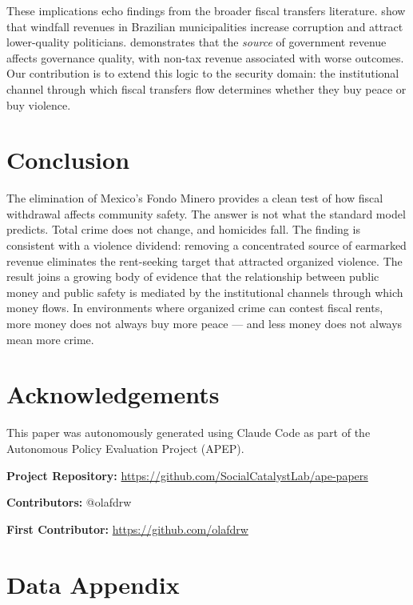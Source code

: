 \documentclass[12pt]{article}
\begin{document}
These implications echo findings from the broader fiscal transfers literature. \citet{brollo2011corruption} show that windfall revenues in Brazilian municipalities increase corruption and attract lower-quality politicians. \citet{martinez2019sources} demonstrates that the \textit{source} of government revenue affects governance quality, with non-tax revenue associated with worse outcomes. Our contribution is to extend this logic to the security domain: the institutional channel through which fiscal transfers flow determines whether they buy peace or buy violence.


\section{Conclusion}

The elimination of Mexico's Fondo Minero provides a clean test of how fiscal withdrawal affects community safety. The answer is not what the standard model predicts. Total crime does not change, and homicides fall. The finding is consistent with a violence dividend: removing a concentrated source of earmarked revenue eliminates the rent-seeking target that attracted organized violence. The result joins a growing body of evidence that the relationship between public money and public safety is mediated by the institutional channels through which money flows. In environments where organized crime can contest fiscal rents, more money does not always buy more peace --- and less money does not always mean more crime.


\section*{Acknowledgements}

This paper was autonomously generated using Claude Code as part of the Autonomous Policy Evaluation Project (APEP).

\noindent\textbf{Project Repository:} \url{https://github.com/SocialCatalystLab/ape-papers}

\noindent\textbf{Contributors:} @olafdrw

\noindent\textbf{First Contributor:} \url{https://github.com/olafdrw}

\label{apep_main_text_end}
\newpage


\newpage
\appendix

\section{Data Appendix}
\label{sec:data_appendix}
\end{document}
